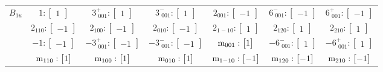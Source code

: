 \documentclass[fleqn,8pt,landscape]{jsarticle}
\begin{document}
\begin{longtable}{ccccccc}
$ B_{1u} $ & $ 1:\begin{bmatrix} 1 \end{bmatrix} $ & $ 3^{+}_{\,\,001}:\begin{bmatrix} 1 \end{bmatrix} $ & $ 3^{-}_{\,\,001}:\begin{bmatrix} 1 \end{bmatrix} $ & $ 2{}_{001}:\begin{bmatrix} -1 \end{bmatrix} $ & $ 6^{-}_{\,\,001}:\begin{bmatrix} -1 \end{bmatrix} $ & $ 6^{+}_{\,\,001}:\begin{bmatrix} -1 \end{bmatrix} $ \\
& $ 2{}_{110}:\begin{bmatrix} -1 \end{bmatrix} $ & $ 2{}_{100}:\begin{bmatrix} -1 \end{bmatrix} $ & $ 2{}_{010}:\begin{bmatrix} -1 \end{bmatrix} $ & $ 2{}_{1-10}:\begin{bmatrix} 1 \end{bmatrix} $ & $ 2{}_{120}:\begin{bmatrix} 1 \end{bmatrix} $ & $ 2{}_{210}:\begin{bmatrix} 1 \end{bmatrix} $ \\
& $ -1:\begin{bmatrix} -1 \end{bmatrix} $ & $ -3^{+}_{\,\,001}:\begin{bmatrix} -1 \end{bmatrix} $ & $ -3^{-}_{\,\,001}:\begin{bmatrix} -1 \end{bmatrix} $ & $ {\rm m}_{001}:\begin{bmatrix} 1 \end{bmatrix} $ & $ -6^{-}_{\,\,001}:\begin{bmatrix} 1 \end{bmatrix} $ & $ -6^{+}_{\,\,001}:\begin{bmatrix} 1 \end{bmatrix} $ \\
& $ {\rm m}_{110}:\begin{bmatrix} 1 \end{bmatrix} $ & $ {\rm m}_{100}:\begin{bmatrix} 1 \end{bmatrix} $ & $ {\rm m}_{010}:\begin{bmatrix} 1 \end{bmatrix} $ & $ {\rm m}_{1-10}:\begin{bmatrix} -1 \end{bmatrix} $ & $ {\rm m}_{120}:\begin{bmatrix} -1 \end{bmatrix} $ & $ {\rm m}_{210}:\begin{bmatrix} -1 \end{bmatrix} $ \\ \hline

\end{longtable}
\end{document}
